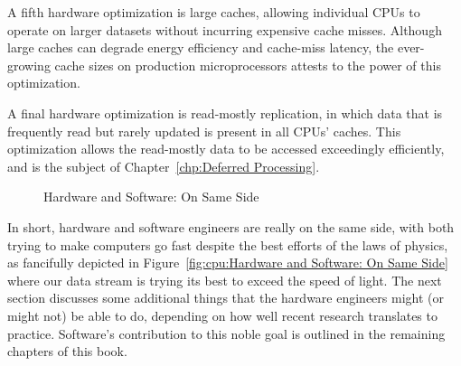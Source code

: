A fifth hardware optimization is large caches, allowing individual
CPUs to operate on larger datasets without incurring expensive cache
misses.
Although large caches can degrade energy efficiency and cache-miss
latency, the ever-growing cache sizes on production microprocessors
attests to the power of this optimization.

A final hardware optimization is read-mostly replication, in which
data that is frequently read but rarely updated is present in all
CPUs' caches.
This optimization allows the read-mostly data to be accessed
exceedingly efficiently, and is the subject of
Chapter~\ref{chp:Deferred Processing}.

\begin{figure}
\centering
{}
\caption{Hardware and Software: On Same Side}
\end{figure}

In short, hardware and software engineers are really on the same side,
with both trying to make computers go fast despite the best efforts of
the laws of physics, as fancifully depicted in
Figure~\ref{fig:cpu:Hardware and Software: On Same Side}
where our data stream is trying its best to exceed the speed of light.
The next section discusses some additional things that the hardware engineers
might (or might not) be able to do, depending on how well recent
research translates to practice.
Software's contribution to this noble goal is outlined in the remaining
chapters of this book.

